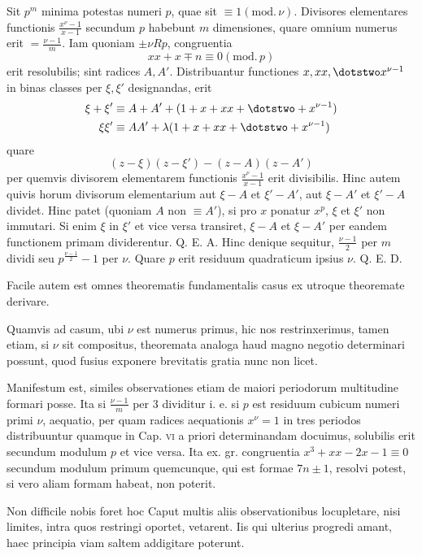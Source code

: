 Sit $p^m$ minima potestas numeri $p$, quae sit $\equiv1(\mathrm{mod.}\,\nu)$. Divisores elementares functionis $\frac{x^\nu-1}{x-1}$ secundum $p$ habebunt $m$ dimensiones, quare omnium numerus erit $=\frac{\nu-1}m$. Iam quoniam $\pm\nu Rp$, congruentia
\[
xx+x\mp n\equiv0(\mathrm{mod.}\,p)
\]
erit resolubilis; sint radices $A,A'$. Distribuantur functiones $x,xx,\dotstwo x^{\nu-1}$ in binas classes per $\xi,\xi'$ designandas, erit
\[
\begin{aligned}
\xi+\xi'&\equiv A+A'+(1+x+xx+\dotstwo+x^{\nu-1})\\
\xi\xi'&\equiv AA'+\lambda(1+x+xx+\dotstwo+x^{\nu-1})
\end{aligned}
\]
quare
\[
(z-\xi)(z-\xi')-(z-A)(z-A')
\]
per quemvis divisorem elementarem functionis $\frac{x^\nu-1}{x-1}$ erit divisibilis. Hinc autem quivis horum divisorum elementarium aut $\xi-A$ et $\xi'-A'$, aut $\xi-A'$ et $\xi'-A$ dividet. Hinc patet (quoniam $A$ non $\equiv A'$), si pro $x$ ponatur $x^p$, $\xi$ et $\xi'$ non immutari. Si enim $\xi$ in $\xi'$ et vice versa transiret, $\xi-A$ et $\xi-A'$ per eandem functionem primam dividerentur. Q. E. A. Hinc denique sequitur, $\frac{\nu-1}2$ per $m$ dividi seu $p^{\frac{\nu-1}2}-1$ per $\nu$. Quare $p$ erit residuum quadraticum ipsius $\nu$. Q. E. D.

Facile autem est omnes theorematis fundamentalis casus ex utroque theoremate derivare.

Quamvis ad casum, ubi $\nu$ est numerus primus, hic nos restrinxerimus, tamen etiam, si $\nu$ sit compositus, theoremata analoga haud magno negotio determinari possunt, quod fusius exponere brevitatis gratia nunc non licet.

Manifestum est, similes observationes etiam de maiori periodorum multitudine formari posse. Ita si $\frac{\nu-1}m$ per $3$ dividitur i. e. si $p$ est residuum cubicum numeri primi $\nu$, aequatio, per quam radices aequationis $x^\nu=1$ in tres periodos distribuuntur quamque in Cap. \textsc{vi} a priori determinandam docuimus, solubilis erit secundum modulum $p$ et vice versa. Ita ex. gr. congruentia $x^3+xx-2x-1\equiv0$ secundum modulum primum quemcunque, qui est formae $7n\pm1$, resolvi potest, si vero aliam formam habeat, non poterit.

Non difficile nobis foret hoc Caput multis aliis observationibus locupletare, nisi limites, intra quos restringi oportet, vetarent. Iis qui ulterius progredi amant, haec principia viam saltem addigitare poterunt.
